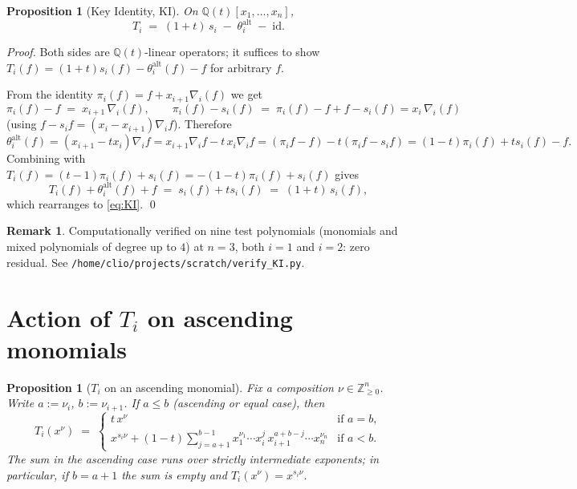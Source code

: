 \documentclass[11pt]{article}
\newtheorem{proposition}[theorem]{Proposition}
\theoremstyle{definition}
\newtheorem{remark}[theorem]{Remark}
\begin{document}
\begin{proposition}[Key Identity, KI]\label{prop:KI}
On $\mathbb{Q}(t)[x_1,\ldots,x_n]$,
\begin{equation}\label{eq:KI}
T_i \;=\; (1+t)\, s_i \;-\; \theta_i^{\mathrm{alt}} \;-\; \mathrm{id}.
\end{equation}
\end{proposition}

\begin{proof}
Both sides are $\mathbb{Q}(t)$-linear operators; it suffices to show
$T_i(f) = (1+t)s_i(f) - \theta_i^{\mathrm{alt}}(f) - f$ for arbitrary $f$.

From the identity $\pi_i(f) = f + x_{i+1} \nabla_i(f)$ we get
\[
\pi_i(f) - f \;=\; x_{i+1}\,\nabla_i(f), \qquad
\pi_i(f) - s_i(f) \;=\; \pi_i(f) - f + f - s_i(f) = x_i\,\nabla_i(f)
\]
(using $f - s_i f = (x_i - x_{i+1})\nabla_i f$). Therefore
\[
\theta_i^{\mathrm{alt}}(f) = (x_{i+1} - t x_i)\nabla_i f
  = x_{i+1}\nabla_i f - t\,x_i\nabla_i f
  = (\pi_i f - f) - t(\pi_i f - s_i f)
  = (1-t)\pi_i(f) + t s_i(f) - f.
\]
Combining with $T_i(f) = (t-1)\pi_i(f) + s_i(f) = -(1-t)\pi_i(f) + s_i(f)$
gives
\[
T_i(f) + \theta_i^{\mathrm{alt}}(f) + f \;=\; s_i(f) + t s_i(f) \;=\; (1+t)\, s_i(f),
\]
which rearranges to \eqref{eq:KI}. \qed
\end{proof}

\begin{remark}
Computationally verified on nine test polynomials (monomials and mixed
polynomials of degree up to $4$) at $n = 3$, both $i = 1$ and $i = 2$:
zero residual. See \texttt{/home/clio/projects/scratch/verify\_KI.py}.
\end{remark}

\section{Action of $T_i$ on ascending monomials}

\begin{proposition}[$T_i$ on an ascending monomial]\label{prop:Ti_ascending}
Fix a composition $\nu \in \mathbb{Z}_{\ge 0}^n$. Write $a := \nu_i$,
$b := \nu_{i+1}$. If $a \le b$ (\emph{ascending or equal case}), then
\begin{equation}\label{eq:Ti_ascending}
T_i(x^\nu) \;=\;
\begin{cases}
  t\,x^\nu & \text{if } a = b,\\[2pt]
  x^{s_i\nu} + (1-t)\displaystyle\sum_{j=a+1}^{b-1} x_1^{\nu_1}\cdots x_i^{j}\,x_{i+1}^{a+b-j}\cdots x_n^{\nu_n} & \text{if } a < b.
\end{cases}
\end{equation}
The sum in the ascending case runs over strictly intermediate exponents;
in particular, if $b = a+1$ the sum is empty and $T_i(x^\nu) = x^{s_i\nu}$.
\end{proposition}
\end{document}
